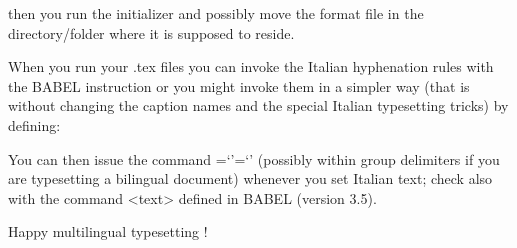 then you run the initializer and possibly move the format file in the
directory/folder where it is supposed to reside.

When you run your .tex files you can invoke the Italian hyphenation rules with
the BABEL instruction  or you might invoke them in a
simpler way (that is without changing the caption names and the special
Italian typesetting tricks) by defining:

\def\italiano{\language=\l@italian \lccode`'=`' }

You can then issue the command \italiano (possibly within group delimiters
if you are typesetting a bilingual document) whenever you set Italian text;
check also with the command \foreignlanguage{<language>}{<text>} defined in
BABEL (version 3.5).

Happy multilingual typesetting !
